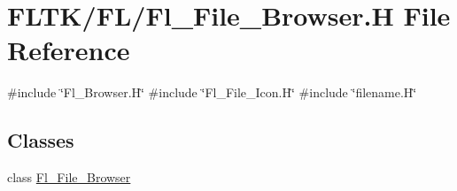 \hypertarget{_fl___file___browser_8_h}{}\section{F\+L\+T\+K/\+F\+L/\+Fl\+\_\+\+File\+\_\+\+Browser.H File Reference}
\label{_fl___file___browser_8_h}
{\ttfamily \#include \char`\"{}Fl\+\_\+\+Browser.\+H\char`\"{}}\newline
{\ttfamily \#include \char`\"{}Fl\+\_\+\+File\+\_\+\+Icon.\+H\char`\"{}}\newline
{\ttfamily \#include \char`\"{}filename.\+H\char`\"{}}\newline
\subsection*{Classes}
\begin{DoxyCompactItemize}
\item 
class \hyperlink{class_fl___file___browser}{Fl\+\_\+\+File\+\_\+\+Browser}
\end{DoxyCompactItemize}
